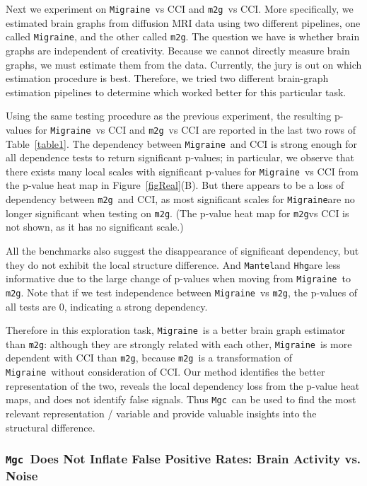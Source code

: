 \documentclass[11pt]{article}
\providecommand{\sct}[1]{{\sc \texttt{#1}}}
\newcommand{\Migraine}{\sct{Migraine}}
\newcommand{\mtg}{\sct{m2g}}
\newcommand{\Mgc}{\sct{Mgc}}
\newcommand{\Hhg}{\sct{Hhg}}
\newcommand{\Mantel}{\sct{Mantel}}
\begin{document}
Next we experiment on \Migraine~vs CCI and \mtg~vs CCI. More specifically, we estimated brain graphs from diffusion MRI data using two different pipelines, one called \Migraine, and the other called \mtg.  The question we have is whether brain graphs are independent of creativity.  Because we cannot directly measure brain graphs, we must estimate them from the data.  Currently, the jury is out on which estimation procedure is best.  Therefore, we tried two different brain-graph estimation pipelines to determine which worked better for this particular task.

Using the same testing procedure as the previous experiment, the resulting p-values for \Migraine~vs CCI and \mtg~vs CCI are reported in the last two rows of Table~\ref{table1}. The dependency between \Migraine~and CCI is strong enough for all dependence tests to return significant p-values; in particular, we observe that there exists many local scales with significant p-values for \Migraine~vs CCI from the p-value heat map in Figure~\ref{figReal}(B). But there appears to be a loss of dependency between \mtg~and CCI, as most significant scales for \Migraine are no longer significant when testing on \mtg. (The p-value heat map for \mtg vs CCI is not shown, as it has no significant scale.)

All the benchmarks also suggest the disappearance of significant dependency, but they do not exhibit the local structure difference. And \Mantel and \Hhg are less informative due to the large change of p-values when moving from \Migraine~to \mtg. Note that if we test independence between \Migraine~vs \mtg, the p-values of all tests are $0$, indicating a strong dependency. 

Therefore in this exploration task, \Migraine~is a better brain graph estimator than \mtg: although they are strongly related with each other, \Migraine~is more dependent with CCI than \mtg, because \mtg~is a transformation of \Migraine~without consideration of CCI. Our method identifies the better representation of the two, reveals the local dependency loss from the p-value heat maps, and does not identify false signals. Thus \Mgc~can be used to find the most relevant representation / variable and provide valuable insights into the structural difference.

\subsubsection[Correct False Positive Rate]{\Mgc~Does Not Inflate False Positive Rates: Brain Activity vs. Noise}
\end{document}
